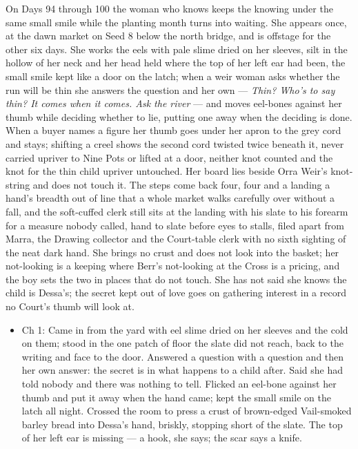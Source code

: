 \documentclass{design/chronicle}
\begin{document}
{On Days 94 through 100 the woman who knows keeps the knowing under the same small smile while the planting month turns into waiting. She appears once, at the dawn market on Seed 8 below the north bridge, and is offstage for the other six days. She works the eels with pale slime dried on her sleeves, silt in the hollow of her neck and her head held where the top of her left ear had been, the small smile kept like a door on the latch; when a weir woman asks whether the run will be thin she answers the question and her own --- \emph{Thin? Who’s to say thin? It comes when it comes. Ask the river} --- and moves eel-bones against her thumb while deciding whether to lie, putting one away when the deciding is done. When a buyer names a figure her thumb goes under her apron to the grey cord and stays; shifting a creel shows the second cord twisted twice beneath it, never carried upriver to Nine Pots or lifted at a door, neither knot counted and the knot for the thin child upriver untouched. Her board lies beside Orra Weir’s knot-string and does not touch it. The steps come back four, four and a landing a hand’s breadth out of line that a whole market walks carefully over without a fall, and the soft-cuffed clerk still sits at the landing with his slate to his forearm for a measure nobody called, hand to slate before eyes to stalls, filed apart from Marra, the Drawing collector and the Court-table clerk with no sixth sighting of the neat dark hand. She brings no crust and does not look into the basket; her not-looking is a keeping where Berr’s not-looking at the Cross is a pricing, and the boy sets the two in places that do not touch. She has not said she knows the child is Dessa’s; the secret kept out of love goes on gathering interest in a record no Court’s thumb will look at.

\begin{itemize}[leftmargin=1.4em,itemsep=1pt,topsep=3pt,parsep=0pt]

\item Ch 1: Came in from the yard with eel slime dried on her sleeves and the cold on them; stood in the one patch of floor the slate did not reach, back to the writing and face to the door. Answered a question with a question and then her own answer: the secret is in what happens to a child after. Said she had told nobody and there was nothing to tell. Flicked an eel-bone against her thumb and put it away when the hand came; kept the small smile on the latch all night. Crossed the room to press a crust of brown-edged Vail-smoked barley bread into Dessa’s hand, briskly, stopping short of the slate. The top of her left ear is missing --- a hook, she says; the scar says a knife.


\end{itemize}}
\end{document}
